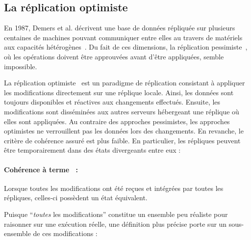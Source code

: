 
\subsection{La réplication optimiste}
\label{repl:subsec:optimistic}

En 1987, Demers et al. décrivent une base de données répliquée sur plusieurs
centaines de machines pouvant communiquer entre elles au travers de matériels
aux capacités hétérogènes~\cite{demers1987epidemic}. Du fait de ces dimensions,
la réplication pessimiste~\cite{alsberg1976principle, gifford1979weighted}, où
les opérations doivent être approuvées avant d'être appliquées, semble
impossible.

La réplication optimiste~\cite{demers1987epidemic, johnson1975maintenance,
  ladin1992providing, saito2005optimistic} est un paradigme de réplication
consistant à appliquer les modifications directement sur une réplique locale.
Ainsi, les données sont toujours disponibles et réactives aux changements
effectués. Ensuite, les modifications sont disséminées aux autres serveurs
hébergeant une réplique où elles sont appliquées. Au contraire des approches
pessimistes, les approches optimistes ne verrouillent pas les données lors des
changements. En revanche, le critère de cohérence assuré est plus faible. En
particulier, les répliques peuvent être temporairement dans des états
divergeants entre eux :


\paragraph{Cohérence à terme~\cite{bailis2013eventual} :} Lorsque toutes les
modifications ont été reçues et intégrées par toutes les répliques, celles-ci
possèdent un état équivalent.

\noindent Puisque ``\emph{toutes} les modifications'' constitue un ensemble peu
réaliste pour raisonner sur une exécution réelle, une définition plus précise
porte sur un sous-ensemble de ces modifications :

